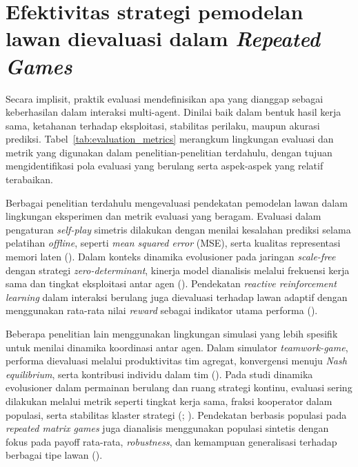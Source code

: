 \section{Efektivitas strategi pemodelan lawan dievaluasi dalam \textit{Repeated Games}}

Secara implisit, praktik evaluasi mendefinisikan apa yang dianggap sebagai keberhasilan dalam interaksi multi-agent. Dinilai baik dalam bentuk hasil kerja sama, ketahanan terhadap eksploitasi, stabilitas perilaku, maupun akurasi prediksi. Tabel~\ref{tab:evaluation_metrics} merangkum lingkungan evaluasi dan metrik yang digunakan dalam penelitian-penelitian terdahulu, dengan tujuan mengidentifikasi pola evaluasi yang berulang serta aspek-aspek yang relatif terabaikan.

Berbagai penelitian terdahulu mengevaluasi pendekatan pemodelan lawan dalam lingkungan eksperimen dan metrik evaluasi yang beragam. Evaluasi dalam pengaturan \textit{self-play} simetris dilakukan dengan menilai kesalahan prediksi selama pelatihan \textit{offline}, seperti \textit{mean squared error} (MSE), serta kualitas representasi memori laten (\cite{qiao_o2m_2024}). Dalam konteks dinamika evolusioner pada jaringan \textit{scale-free} dengan strategi \textit{zero-determinant}, kinerja model dianalisis melalui frekuensi kerja sama dan tingkat eksploitasi antar agen (\cite{zhu_evolutionary_2025}). Pendekatan \textit{reactive reinforcement learning} dalam interaksi berulang juga dievaluasi terhadap lawan adaptif dengan menggunakan rata-rata nilai \textit{reward} sebagai indikator utama performa (\cite{lv_inducing_2023}).

Beberapa penelitian lain menggunakan lingkungan simulasi yang lebih spesifik untuk menilai dinamika koordinasi antar agen. Dalam simulator \textit{teamwork-game}, performa dievaluasi melalui produktivitas tim agregat, konvergensi menuju \textit{Nash equilibrium}, serta kontribusi individu dalam tim (\cite{gomez_grounded_2025}). Pada studi dinamika evolusioner dalam permainan berulang dan ruang strategi kontinu, evaluasi sering dilakukan melalui metrik seperti tingkat kerja sama, fraksi kooperator dalam populasi, serta stabilitas klaster strategi (\cite{di_coupling_2023}; \cite{elhamer_effects_2020}). Pendekatan berbasis populasi pada \textit{repeated matrix games} juga dianalisis menggunakan populasi sintetis dengan fokus pada payoff rata-rata, \textit{robustness}, dan kemampuan generalisasi terhadap berbagai tipe lawan (\cite{perera_learning_2025}).

